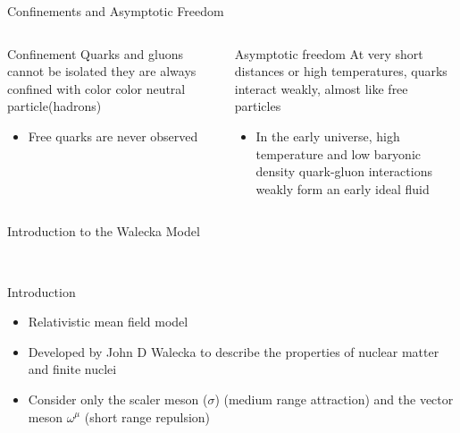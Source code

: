 \documentclass[12pt,aspectratio169]{beamer}
\begin{document}
\begin{frame}{Confinements and Asymptotic Freedom}
    \begin{columns}
    \begin{block}{Confinement}
        Quarks and gluons cannot be isolated they are always confined with color color neutral particle(hadrons)
        \begin{itemize}
            \item Free quarks are never observed
        \end{itemize}
    \end{block}
    \begin{block}{Asymptotic freedom}
    At very short distances or high temperatures, quarks interact weakly, almost like free particles
    \begin{itemize}
        \item In the early universe, high temperature and low baryonic density quark-gluon interactions weakly form an early ideal fluid
    \end{itemize}
        
    \end{block}
\end{columns}

\end{frame}
\begin{frame}{Introduction to the Walecka Model}
    \begin{itemize}
        \
    \end{itemize}
    \begin{block}{Introduction}
    \begin{itemize}
        \item Relativistic mean field model 
        \item Developed by John D Walecka to describe the properties  of nuclear matter and finite nuclei
        \item Consider only the scaler meson ($\sigma$) (medium range attraction) and the vector meson $\omega^\mu$ (short range repulsion) 
    \end{itemize}
    \end{block}
    
\end{frame}
\end{document}
